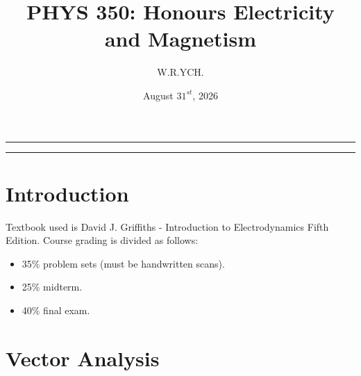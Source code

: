 \documentclass{article}
\begin{document}
\title{PHYS 350: Honours Electricity and Magnetism}
\author{W.R.YCH.}
\date{August \(31^{st}\), 2026}
\setcounter{Maxaffil}{0}
\renewcommand\Affilfont{\itshape\small}
\maketitle
\noindent\rule{\textwidth}{0.4pt}
\thispagestyle{empty}
\begin{abstract}
\end{abstract}
\noindent\rule{\textwidth}{0.4pt}
\clearpage
\pagestyle{empty}
{
  \hypersetup{linkcolor=black}
  \tableofcontents
}
\clearpage
\pagestyle{plain}
\setcounter{page}{1}


\section{Introduction}
Textbook used is David J. Griffiths - Introduction to Electrodynamics Fifth Edition. Course grading is divided as follows:
\begin{itemize}
    \item 35\% problem sets (must be handwritten scans).
    \item 25\% midterm.
    \item 40\% final exam.
\end{itemize}


\section{Vector Analysis}
\end{document}
